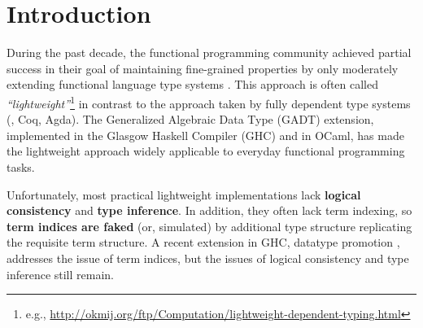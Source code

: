 \section{Introduction}
During the past decade, the functional programming community achieved
partial success in their goal of maintaining fine-grained properties
by only moderately extending functional language type systems
\cite{CheHin03,CheHin02,Xi03}.
This approach is often called \emph{``lightweight''}\footnote{e.g.,
  \url{http://okmij.org/ftp/Computation/lightweight-dependent-typing.html} }
in contrast to the approach taken by fully dependent type systems
(\eg, Coq, Agda).
The Generalized Algebraic Data Type (GADT) extension, implemented
in the Glasgow Haskell Compiler (GHC) and in OCaml\cite{ManStu09,GarNor11}, 
has made the lightweight approach
widely applicable to everyday functional programming tasks.

Unfortunately, most practical lightweight implementations 
lack \textbf{logical consistency} and
\textbf{type inference}. In addition,
they often lack term indexing, so \textbf{term indices are faked}
(or, simulated) by additional type structure replicating the requisite term
structure.
A recent extension in GHC, datatype promotion \cite{YorgeyWCJVM12},
addresses the issue of term indices, but the issues of
logical consistency and type inference still remain.


